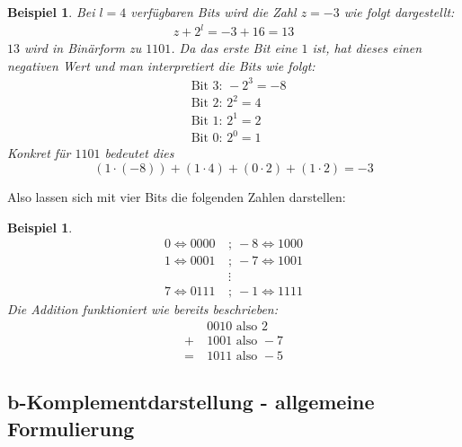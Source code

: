 \documentclass{article}
\newtheorem{beispiel}[satz]{Beispiel}
\begin{document}
    \begin{beispiel} \label{bsp:Komplementdarstellung_Erklärung}
      Bei $l=4$ verfügbaren Bits wird die Zahl $z=-3$ wie folgt dargestellt:
      \begin{align*}
        z+2^l = -3+16 = 13
      \end{align*}
      $13$ wird in Binärform zu $1101$.
      Da das erste Bit eine $1$ ist, hat dieses einen negativen Wert und man interpretiert die Bits wie folgt:
      \begin{align*}
        &\text{Bit 3: } -2^3 = -8 \\
        &\text{Bit 2: } 2^2 = 4 \\
        &\text{Bit 1: } 2^1 = 2 \\
        &\text{Bit 0: } 2^0 = 1
      \end{align*}
      Konkret für $1101$ bedeutet dies
      \begin{equation*}
        (1 \cdot (-8)) + (1 \cdot 4) + (0 \cdot 2) + (1 \cdot 2) = -3
      \end{equation*}
    \end{beispiel}

    \vspace{\baselineskip}

    Also lassen sich mit vier Bits die folgenden Zahlen darstellen:
    \begin{beispiel} \label{bsp:Komplementdarstellung_4Bits}
      \begin{align*}
        0 \Leftrightarrow 0000  ~&;~  -8 \Leftrightarrow 1000 \\
        1 \Leftrightarrow 0001  ~&;~  -7 \Leftrightarrow 1001 \\
        & \vdots \\
        7 \Leftrightarrow 0111  ~&;~  -1 \Leftrightarrow 1111
      \end{align*}    
      Die Addition funktioniert wie bereits beschrieben:
      \begin{align*}
        &0010 \text{ also } 2 \\
        +~ &1001 \text{ also } -7 \\
        =~ &1011 \text{ also } -5
      \end{align*}
    \end{beispiel}


\subsection{b-Komplementdarstellung - allgemeine Formulierung}
\end{document}

